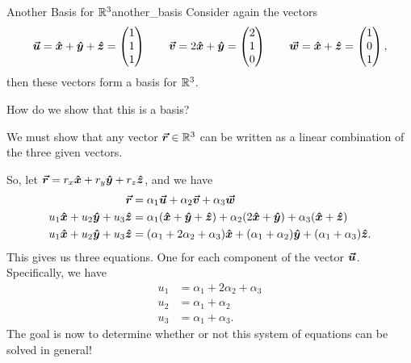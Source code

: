         \begin{ex}{Another Basis for $\mathbb{R}^3$}{another_basis}
        Consider again the vectors
            \[
            \boldsymbol{\boldsymbol{\vec{u}}} = \boldsymbol{\hat{x}} + \boldsymbol{\hat{y}} + \boldsymbol{\hat{z}} = \begin{pmatrix} 1 \\ 1 \\ 1\end{pmatrix} \qquad \boldsymbol{\boldsymbol{\vec{v}}} = 2\boldsymbol{\hat{x}} + \boldsymbol{\hat{y}} = \begin{pmatrix} 2 \\ 1 \\ 0 \end{pmatrix} \qquad \boldsymbol{\boldsymbol{\vec{w}}} = \boldsymbol{\hat{x}} + \boldsymbol{\hat{z}} = \begin{pmatrix} 1 \\ 0 \\ 1 \end{pmatrix},
            \]
            then these vectors form a basis for $\mathbb{R}^3$. 
            \begin{question}
            How do we show that this is a basis?
            \end{question}
            \begin{answer}
            We must show that any vector $\boldsymbol{\vec{r}} \in \mathbb{R}^3$ can be written as a linear combination of the three given vectors.
            \end{answer}
            So, let $\boldsymbol{\vec{r}} = r_x\boldsymbol{\hat{x}} + r_y\boldsymbol{\hat{y}} + r_z \boldsymbol{\hat{z}}$, and we have
            \begin{align*}
                \boldsymbol{\vec{r}} &= \alpha_1 \boldsymbol{\boldsymbol{\vec{u}}} + \alpha_2 \boldsymbol{\boldsymbol{\vec{v}}} + \alpha_3 \boldsymbol{\boldsymbol{\vec{w}}}\\
                u_1 \boldsymbol{\hat{x}} + u_2 \boldsymbol{\hat{y}} + u_3 \boldsymbol{\hat{z}} &= \alpha_1 (\boldsymbol{\hat{x}} + \boldsymbol{\hat{y}} + \boldsymbol{\hat{z}}) + \alpha_2 (2\boldsymbol{\hat{x}} + \boldsymbol{\hat{y}}) + \alpha_3 (\boldsymbol{\hat{x}} + \boldsymbol{\hat{z}})\\
                u_1 \boldsymbol{\hat{x}} + u_2 \boldsymbol{\hat{y}} + u_3 \boldsymbol{\hat{z}} &= (\alpha_1 +2\alpha_2 + \alpha_3)\boldsymbol{\hat{x}} + (\alpha_1 +\alpha_2)\boldsymbol{\hat{y}} + (\alpha_1 +\alpha_3)\boldsymbol{\hat{z}}.
            \end{align*}
            This gives us three equations. One for each component of the vector $\boldsymbol{\boldsymbol{\vec{u}}}$. Specifically, we have
            \begin{align*}
                u_1 &= \alpha_1 + 2\alpha_2 + \alpha_3 \\
                u_2 &= \alpha_1 + \alpha_2\\
                u_3 &= \alpha_1 + \alpha_3.
            \end{align*}
            The goal is now to determine whether or not this system of equations can be solved in general!
        \end{ex}
        
